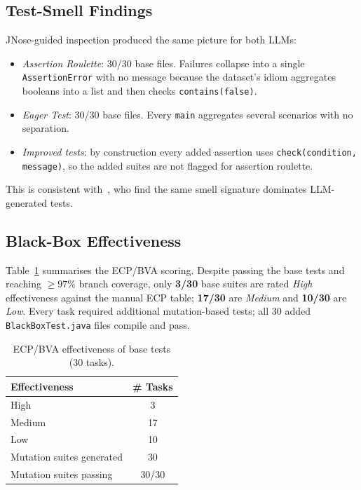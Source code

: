 \documentclass[journal]{IEEEtran}
\begin{document}
\subsection{Test-Smell Findings}
JNose-guided inspection produced the same picture for both
LLMs:
\begin{itemize}
    \item \emph{Assertion Roulette}: 30/30 base files.
    Failures collapse into a single \texttt{AssertionError}
    with no message because the dataset's idiom aggregates
    booleans into a list and then checks
    \texttt{contains(false)}.
    \item \emph{Eager Test}: 30/30 base files. Every
    \texttt{main} aggregates several scenarios with no
    separation.
    \item \emph{Improved tests}: by construction every added
    assertion uses \texttt{check(condition, message)}, so the
    added suites are not flagged for assertion roulette.
\end{itemize}
This is consistent with~\cite{grano2024testsmells}, who find
the same smell signature dominates LLM-generated tests.

\subsection{Black-Box Effectiveness}
\label{ssec:eff}
Table~\ref{tab:effsummary} summarises the ECP/BVA scoring.
Despite passing the base tests and reaching $\geq 97\%$ branch
coverage, only \textbf{3/30} base suites are rated \emph{High}
effectiveness against the manual ECP table; \textbf{17/30}
are \emph{Medium} and \textbf{10/30} are \emph{Low}. Every
task required additional mutation-based tests; all 30 added
\texttt{BlackBoxTest.java} files compile and pass.

\begin{table}[!t]
\centering
\caption{ECP/BVA effectiveness of base tests (30 tasks).}
\label{tab:effsummary}
\renewcommand{\arraystretch}{1.15}
\begin{tabular}{@{}l c@{}}
\toprule
\textbf{Effectiveness} & \textbf{\# Tasks} \\
\midrule
High   & 3 \\
Medium & 17 \\
Low    & 10 \\
\midrule
Mutation suites generated & 30    \\
Mutation suites passing   & 30/30 \\
\bottomrule
\end{tabular}
\end{table}
\end{document}
